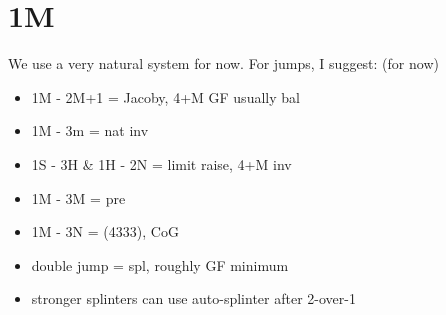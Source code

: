 \section{1M}

We use a very natural system for now. For jumps, I suggest: (for now)
\begin{itemize}
    \setlength\itemsep{0pt}
    \item 1M - 2M+1 = Jacoby, 4+M GF usually bal
    \item 1M - 3m = nat inv
    \item 1S - 3H \& 1H - 2N = limit raise, 4+M inv
    \item 1M - 3M = pre
    \item 1M - 3N = (4333), CoG
    \item double jump = spl, roughly GF minimum
    \item stronger splinters can use auto-splinter after 2-over-1
\end{itemize}


